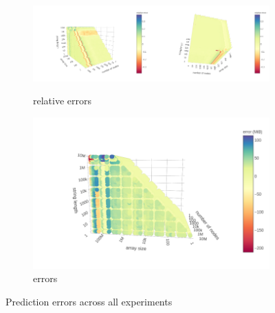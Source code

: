 \documentclass{article}
\begin{document}
\begin{figure}
  \centering
  \begin{subfigure}[t]{\textwidth}
    \centering
    \includegraphics[width=0.5\textwidth]{../local_experiments/io_memory_tests/plots/prediction_relative1.png}\includegraphics[width=0.5\textwidth]{../local_experiments/io_memory_tests/plots/prediction_relative2.png}
    \caption{relative errors}
  \end{subfigure}
  \begin{subfigure}[t]{0.49\textwidth}
    \centering
    \includegraphics[width=\textwidth]{../local_experiments/io_memory_tests/plots/prediction_errors.png}
    \caption{errors}
    \label{fig:prediction_error_b}
  \end{subfigure}
  \caption{Prediction errors across all experiments}
  \label{fig:prediction_errors}
\end{figure}
\end{document}
